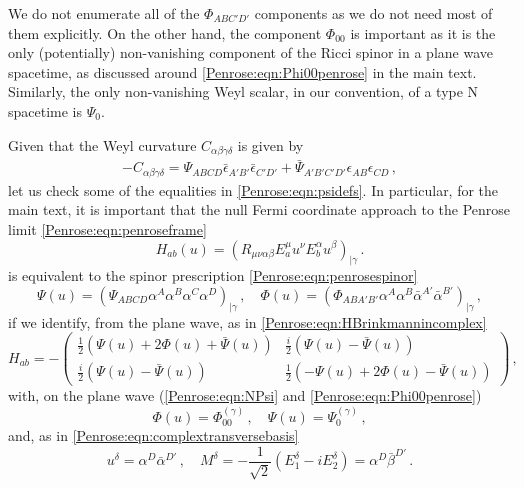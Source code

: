 We do not enumerate all of the $\Phi_{ABC'D'}$ components as we do not need most of them explicitly. On the other hand, the component $\Phi_{00}$ is important as it is the only (potentially) non-vanishing component of the Ricci spinor in a plane wave spacetime, as discussed around \eqref{Penrose:eqn:Phi00penrose} in the main text. Similarly, the only non-vanishing Weyl scalar, in our convention, of a type N spacetime is $\Psi_0$.

Given that the Weyl curvature $C_{\alpha \beta \gamma \delta}$ is given by
\begin{equation}
\begin{aligned}
-C_{\alpha \beta \gamma \delta} = \Psi_{ABCD} \bar{\epsilon}_{A'B'}\bar{\epsilon}_{C'D'} 
+ \bar{\Psi}_{A'B'C'D'} \epsilon_{AB}\epsilon_{CD} \, ,
\end{aligned}
\end{equation}
let us check some of the equalities in \eqref{Penrose:eqn:psidefs}. In particular, for the main text, it is important that the null Fermi coordinate approach to the Penrose limit \eqref{Penrose:eqn:penroseframe} \cite{Blau:2006ar,blau2011plane}
\begin{equation}\label{Penrose:eqn:appHPenrose}
H_{ab}(u) = \left(R_{\mu \nu \alpha \beta} E^{\mu}_a u^{\nu} E^{\alpha}_b u^{\beta} \right)_{|\gamma} \, .
\end{equation}
is equivalent to the spinor prescription \eqref{Penrose:eqn:penrosespinor} \cite{Tod:2019urw}
\begin{equation}\label{Penrose:eqn:app:penrosespinor}
\Psi(u) = \left(\Psi_{ABCD}\alpha^A \alpha^B \alpha^C \alpha^D\right)_{|\gamma} \, , \quad \Phi(u) = \left(\Phi_{ABA'B'}\alpha^A \alpha^B \bar{\alpha}^{A'} \bar{\alpha}^{B'}\right)_{|\gamma} \, ,
\end{equation}
if we identify, from the plane wave, as in \eqref{Penrose:eqn:HBrinkmannincomplex}
\begin{equation}\label{Penrose:eqn:app:H}
H_{ab} = - \begin{pmatrix}
\frac{1}{2}\left(\Psi(u)+ 2 \Phi(u)  + \bar{\Psi}(u)\right) & 	\frac{i}{2}\left(\Psi(u) - \bar{\Psi}(u)\right)\\
\frac{i}{2}\left(\Psi(u) - \bar{\Psi}(u)\right) 	&  \frac{1}{2}\left(-\Psi(u)+ 2 \Phi(u)  - \bar{\Psi}(u)\right) 
\end{pmatrix}  \, ,
\end{equation}
with, on the plane wave (\eqref{Penrose:eqn:NPsi} and \eqref{Penrose:eqn:Phi00penrose})
\begin{equation}\label{Penrose:eqn:app:Psiplane}
\Phi(u) = \Phi^{(\gamma)}_{00} \, , \quad \Psi(u) = \Psi^{(\gamma)}_0 \, ,
\end{equation}
and, as in \eqref{Penrose:eqn:complextransversebasis}
\begin{equation}\label{Penrose:eqn:app:uplane}
u^{\delta} = \alpha^D \bar{\alpha}^{D'} \, , \quad M^{\delta} = -\frac{1}{\sqrt{2}}\left(E^{\delta}_1 - i E^{\delta}_2 \right) = \alpha^D \bar{\beta}^{D'} \, .
\end{equation}

